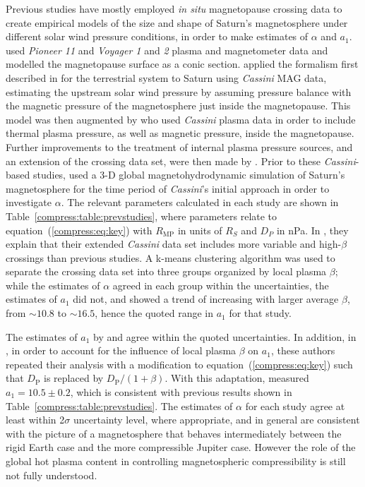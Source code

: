 Previous studies have mostly employed \textit{in situ} magnetopause crossing data to create empirical models of the size and shape of Saturn's magnetosphere under different solar wind pressure conditions, in order to make estimates of $\alpha$ and $a_1$. \citet{slavin1985} used \textit{Pioneer 11} and \textit{Voyager 1} and \textit{2} plasma and magnetometer data and modelled the magnetopause surface as a conic section. \citet{arridge2006} applied the formalism first described in \citet{shue1997} for the terrestrial system to Saturn using \textit{Cassini} MAG data, estimating the upstream solar wind pressure by assuming pressure balance with the magnetic pressure of the magnetosphere just inside the magnetopause. This model was then augmented by \citet{kanani2010} who used \textit{Cassini} plasma data in order to include thermal plasma pressure, as well as magnetic pressure, inside the magnetopause. Further improvements to the treatment of internal plasma pressure sources, and an extension of the crossing data set, were then made by \citet{pilkington2015}. Prior to these \textit{Cassini}-based studies, \citet{hansen2005} used a 3-D global magnetohydrodynamic simulation of Saturn's magnetosphere for the time period of \textit{Cassini}'s initial approach in order to investigate $\alpha$. The relevant parameters calculated in each study are shown in Table~\ref{compress:table:prevstudies}, where parameters relate to equation~(\ref{compress:eq:key}) with $R_\mathrm{MP}$ in units of $\si{R_S}$ and $D_{P}$ in \si{nPa}. In \citet{pilkington2015}, they explain that their extended \textit{Cassini} data set includes more variable and high-$\beta$ crossings than previous studies. A k-means clustering algorithm was used to separate the crossing data set into three groups organized by local plasma $\beta$; while the estimates of $\alpha$ agreed in each group within the uncertainties, the estimates of $a_1$ did not, and showed a trend of increasing with larger average $\beta$, from ${\sim}10.8$ to ${\sim}16.5$, hence the quoted range in $a_1$ for that study.

The estimates of $a_1$ by \citet{arridge2006} and \citet{kanani2010} agree within the quoted uncertainties. In addition, in \citet{pilkington2015}, in order to account for the influence of local plasma $\beta$ on $a_1$, these authors repeated their analysis with a modification to equation~(\ref{compress:eq:key}) such that $D_\mathrm{P}$ is replaced by $D_\mathrm{P}/(1+\beta)$. With this adaptation, \citet{pilkington2015} measured $a_1 = 10.5 \pm 0.2$, which is consistent with previous results shown in Table~\ref{compress:table:prevstudies}. The estimates of $\alpha$ for each study agree at least within 2$\sigma$ uncertainty level, where appropriate, and in general are consistent with the picture of a magnetosphere that behaves intermediately between the rigid Earth case and the more compressible Jupiter case. However the role of the global hot plasma content in controlling magnetospheric compressibility is still not fully understood.

